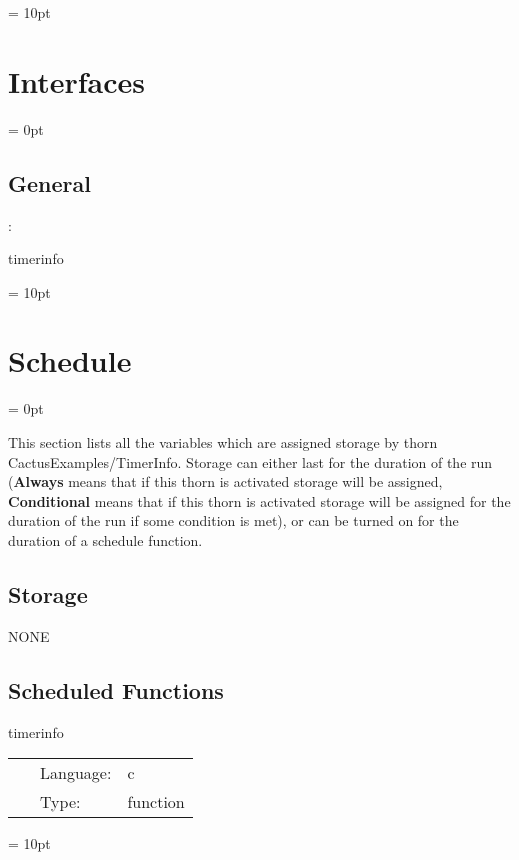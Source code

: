 \vspace{0.5cm}\parskip = 10pt 

\section{Interfaces} 


\parskip = 0pt

\vspace{3mm} \subsection*{General}

: 

timerinfo
\vspace{2mm}

\vspace{5mm}\parskip = 10pt 

\section{Schedule} 


\parskip = 0pt


\noindent This section lists all the variables which are assigned storage by thorn CactusExamples/TimerInfo.  Storage can either last for the duration of the run ({\bf Always} means that if this thorn is activated storage will be assigned, {\bf Conditional} means that if this thorn is activated storage will be assigned for the duration of the run if some condition is met), or can be turned on for the duration of a schedule function.


\subsection*{Storage}NONE
\subsection*{Scheduled Functions}
\vspace{5mm}


\hspace{5mm} timerinfo 

\hspace{5mm}{\it print information from cactus timers } 


\hspace{5mm}

 \begin{tabular*}{160mm}{cll} 
~ & Language:  & c \\ 
~ & Type:  & function \\ 
\end{tabular*} 



\vspace{5mm}\parskip = 10pt 

